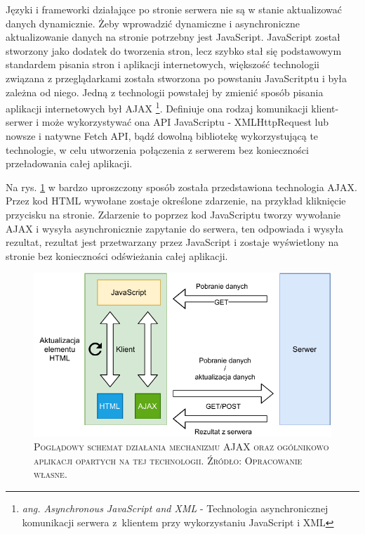 \documentclass[12pt,a4paper,oneside]{book}
\newcommand{\captionT}[1]{\caption{\textsc{\footnotesize{#1}}}}
\begin{document}
Języki i frameworki działające po stronie serwera nie są w stanie aktualizować danych dynamicznie. Żeby wprowadzić dynamiczne i asynchroniczne aktualizowanie danych na stronie potrzebny jest JavaScript. JavaScript został stworzony jako dodatek do tworzenia stron, lecz szybko stał się podstawowym standardem pisania stron i aplikacji internetowych, większość technologii związana z przeglądarkami została stworzona po powstaniu JavaScritptu i była zależna od niego. Jedną z technologii powstałej by zmienić sposób pisania aplikacji internetowych był AJAX \footnote{\textit{ang. Asynchronous JavaScript and XML} - Technologia asynchronicznej komunikacji serwera z~klientem przy wykorzystaniu JavaScript i XML}. Definiuje ona rodzaj komunikacji klient-serwer i może wykorzystywać ona API JavaScriptu - XMLHttpRequest lub nowsze i natywne Fetch API, bądź dowolną bibliotekę wykorzystującą te technologie, w celu utworzenia połączenia z serwerem bez konieczności przeładowania całej aplikacji.

Na rys. \ref{rys_ajax} w bardzo uproszczony sposób została przedstawiona technologia AJAX. Przez kod HTML wywołane zostaje określone zdarzenie, na przykład kliknięcie przycisku na stronie. Zdarzenie to poprzez kod JavaScriptu tworzy wywołanie AJAX i wysyła asynchronicznie zapytanie do serwera, ten odpowiada i wysyła rezultat, rezultat jest przetwarzany przez JavaScript i zostaje wyświetlony na stronie bez konieczności odświeżania całej aplikacji.

\begin{figure}[H]
\centering
\includegraphics[width=1\textwidth]{images/Ajax.pdf}
\captionT{Poglądowy schemat działania mechanizmu AJAX oraz ogólnikowo aplikacji opartych na tej technologii. Źródło: Opracowanie własne.}
\label{rys_ajax}
\end{figure}
\end{document}
